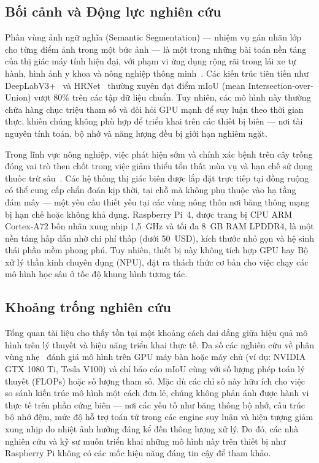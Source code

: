 \documentclass[conference]{IEEEtran}
\begin{document}
\subsection{Bối cảnh và Động lực nghiên cứu}

Phân vùng ảnh ngữ nghĩa (Semantic Segmentation) --- nhiệm vụ gán nhãn lớp cho từng điểm ảnh trong một bức ảnh --- là một trong những bài toán nền tảng của thị giác máy tính hiện đại, với phạm vi ứng dụng rộng rãi trong lái xe tự hành, hình ảnh y khoa và nông nghiệp thông minh~\cite{ngugi2020image,chen2018encoder}. Các kiến trúc tiên tiến như DeepLabV3+~\cite{chen2018encoder} và HRNet~\cite{wang2020high} thường xuyên đạt điểm mIoU (mean Intersection-over-Union) vượt 80\% trên các tập dữ liệu chuẩn. Tuy nhiên, các mô hình này thường chứa hàng chục triệu tham số và đòi hỏi GPU mạnh để suy luận theo thời gian thực, khiến chúng không phù hợp để triển khai trên các thiết bị biên --- nơi tài nguyên tính toán, bộ nhớ và năng lượng đều bị giới hạn nghiêm ngặt.

Trong lĩnh vực nông nghiệp, việc phát hiện sớm và chính xác bệnh trên cây trồng đóng vai trò then chốt trong việc giảm thiểu tổn thất mùa vụ và hạn chế sử dụng thuốc trừ sâu~\cite{mohanty2016using}. Các hệ thống thị giác biên được lắp đặt trực tiếp tại đồng ruộng có thể cung cấp chẩn đoán kịp thời, tại chỗ mà không phụ thuộc vào hạ tầng đám mây --- một yêu cầu thiết yếu tại các vùng nông thôn nơi băng thông mạng bị hạn chế hoặc không khả dụng. Raspberry Pi~4, được trang bị CPU ARM Cortex-A72 bốn nhân xung nhịp 1,5~GHz và tối đa 8~GB RAM LPDDR4, là một nền tảng hấp dẫn nhờ chi phí thấp (dưới 50~USD), kích thước nhỏ gọn và hệ sinh thái phần mềm phong phú. Tuy nhiên, thiết bị này không tích hợp GPU hay Bộ xử lý thần kinh chuyên dụng (NPU), đặt ra thách thức cơ bản cho việc chạy các mô hình học sâu ở tốc độ khung hình tương tác.

\subsection{Khoảng trống nghiên cứu}

Tổng quan tài liệu cho thấy tồn tại một khoảng cách dai dẳng giữa hiệu quả mô hình trên lý thuyết và hiệu năng triển khai thực tế. Đa số các nghiên cứu về phân vùng nhẹ~\cite{zhao2021lightweight,bisenet2018} đánh giá mô hình trên GPU máy bàn hoặc máy chủ (ví dụ: NVIDIA GTX 1080 Ti, Tesla V100) và chỉ báo cáo mIoU cùng với số lượng phép toán lý thuyết (FLOPs) hoặc số lượng tham số. Mặc dù các chỉ số này hữu ích cho việc so sánh kiến trúc mô hình một cách đơn lẻ, chúng không phản ánh được hành vi thực tế trên phần cứng biên --- nơi các yếu tố như băng thông bộ nhớ, cấu trúc bộ nhớ đệm, mức độ hỗ trợ toán tử trong các engine suy luận và hiện tượng giảm xung nhịp do nhiệt ảnh hưởng đáng kể đến thông lượng xử lý. Do đó, các nhà nghiên cứu và kỹ sư muốn triển khai những mô hình này trên thiết bị như Raspberry Pi không có các mốc hiệu năng đáng tin cậy để tham khảo.
\end{document}
